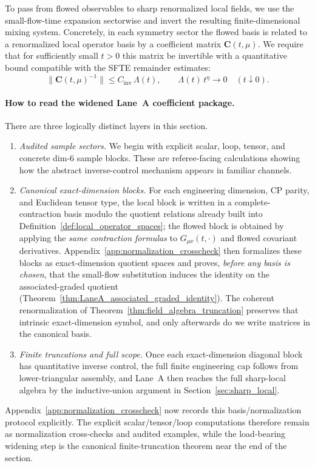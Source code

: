 To pass from flowed observables to sharp renormalized local fields, we use the small-flow-time expansion sectorwise
and invert the resulting finite-dimensional mixing system.
Concretely, in each symmetry sector the flowed basis is related to a renormalized local operator basis by a coefficient matrix
$\mathbf C(t,\mu)$.
We require that for sufficiently small $t>0$ this matrix be invertible with a quantitative bound compatible with the SFTE remainder estimates:
\[
\|\mathbf C(t,\mu)^{-1}\|\le C_{\mathrm{inv}}\,\Lambda(t),
\qquad
\Lambda(t)\,t^\eta\to 0\quad (t\downarrow 0).
\]

\paragraph{How to read the widened Lane~A coefficient package.}
There are three logically distinct layers in this section.
\begin{enumerate}[label=(\roman*),leftmargin=2.3em]
\item \emph{Audited sample sectors.}
We begin with explicit scalar, loop, tensor, and concrete dim-$6$ sample blocks.
These are referee-facing calculations showing how the abstract inverse-control mechanism appears in familiar channels.
\item \emph{Canonical exact-dimension blocks.}
For each engineering dimension, CP parity, and Euclidean tensor type, the local block is written in a complete-contraction basis modulo the quotient relations already built into Definition~\ref{def:local_operator_spaces};
the flowed block is obtained by applying the \emph{same contraction formulas} to $G_{\mu\nu}(t,\cdot)$ and flowed covariant derivatives.
Appendix~\ref{app:normalization_crosscheck} then formalizes these blocks as exact-dimension quotient spaces and proves, \emph{before any basis is chosen},
that the small-flow substitution induces the identity on the associated-graded quotient (Theorem~\ref{thm:LaneA_associated_graded_identity}).
The coherent renormalization of Theorem~\ref{thm:field_algebra_truncation} preserves that intrinsic exact-dimension symbol, and only afterwards do we write matrices in the canonical basis.
\item \emph{Finite truncations and full scope.}
Once each exact-dimension diagonal block has quantitative inverse control, the full finite engineering cap follows from lower-triangular assembly,
and Lane~A then reaches the full sharp-local algebra by the inductive-union argument in Section~\ref{sec:sharp_local}.
\end{enumerate}
Appendix~\ref{app:normalization_crosscheck} now records this basis/normalization protocol explicitly.
The explicit scalar/tensor/loop computations therefore remain as normalization cross-checks and audited examples,
while the load-bearing widening step is the canonical finite-truncation theorem near the end of the section.

